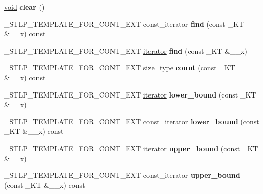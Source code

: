 \begin{DoxyCompactItemize}
\item 
\mbox{\label{classset_aac453bed9a1533ae8b61b742715cd9b6}} 
\hyperlink{interfacevoid}{void} {\bfseries clear} ()
\item 
\mbox{\label{classset_af0da5cfd76294579571b69f02d34a4c8}} 
\+\_\+\+S\+T\+L\+P\+\_\+\+T\+E\+M\+P\+L\+A\+T\+E\+\_\+\+F\+O\+R\+\_\+\+C\+O\+N\+T\+\_\+\+E\+XT const\+\_\+iterator {\bfseries find} (const \+\_\+\+KT \&\+\_\+\+\_\+x) const
\item 
\mbox{\label{classset_ad3a014a4f6c8e4e1a434a4154601ef38}} 
\+\_\+\+S\+T\+L\+P\+\_\+\+T\+E\+M\+P\+L\+A\+T\+E\+\_\+\+F\+O\+R\+\_\+\+C\+O\+N\+T\+\_\+\+E\+XT \hyperlink{structiterator}{iterator} {\bfseries find} (const \+\_\+\+KT \&\+\_\+\+\_\+x)
\item 
\mbox{\label{classset_ad9e90e165a8c79914bada7b0bdd7d2d1}} 
\+\_\+\+S\+T\+L\+P\+\_\+\+T\+E\+M\+P\+L\+A\+T\+E\+\_\+\+F\+O\+R\+\_\+\+C\+O\+N\+T\+\_\+\+E\+XT size\+\_\+type {\bfseries count} (const \+\_\+\+KT \&\+\_\+\+\_\+x) const
\item 
\mbox{\label{classset_ad76fd2219200a0fecd43ffdd736cec47}} 
\+\_\+\+S\+T\+L\+P\+\_\+\+T\+E\+M\+P\+L\+A\+T\+E\+\_\+\+F\+O\+R\+\_\+\+C\+O\+N\+T\+\_\+\+E\+XT \hyperlink{structiterator}{iterator} {\bfseries lower\+\_\+bound} (const \+\_\+\+KT \&\+\_\+\+\_\+x)
\item 
\mbox{\label{classset_a1f6298cd08684595eca1f8f717c73e24}} 
\+\_\+\+S\+T\+L\+P\+\_\+\+T\+E\+M\+P\+L\+A\+T\+E\+\_\+\+F\+O\+R\+\_\+\+C\+O\+N\+T\+\_\+\+E\+XT const\+\_\+iterator {\bfseries lower\+\_\+bound} (const \+\_\+\+KT \&\+\_\+\+\_\+x) const
\item 
\mbox{\label{classset_a21fd087f263489ec80dc33479b330bea}} 
\+\_\+\+S\+T\+L\+P\+\_\+\+T\+E\+M\+P\+L\+A\+T\+E\+\_\+\+F\+O\+R\+\_\+\+C\+O\+N\+T\+\_\+\+E\+XT \hyperlink{structiterator}{iterator} {\bfseries upper\+\_\+bound} (const \+\_\+\+KT \&\+\_\+\+\_\+x)
\item 
\mbox{\label{classset_aed967f4c4ba2b9f33115b6756ca21af3}} 
\+\_\+\+S\+T\+L\+P\+\_\+\+T\+E\+M\+P\+L\+A\+T\+E\+\_\+\+F\+O\+R\+\_\+\+C\+O\+N\+T\+\_\+\+E\+XT const\+\_\+iterator {\bfseries upper\+\_\+bound} (const \+\_\+\+KT \&\+\_\+\+\_\+x) const

\end{DoxyCompactItemize}
